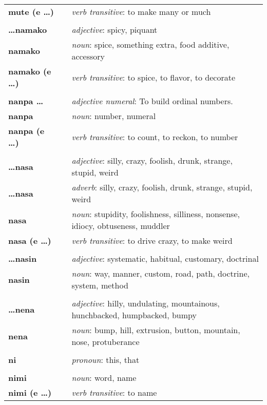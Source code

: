 \begin{supertabular}{p{2,5cm}|ll}
\textbf{mute (e \dots)} && \textit{verb transitive}: to make many or much \\ 
 && \\ %
\textbf{\dots namako} && \textit{adjective}: spicy, piquant \\ 
\textbf{namako} && \textit{noun}: spice, something extra, food additive, accessory \\ 
\textbf{namako (e \dots)} && \textit{verb transitive}: to spice, to flavor, to decorate \\ 
 && \\ %
\textbf{nanpa \dots} && \textit{adjective numeral}: To build ordinal numbers. \\ 
\textbf{nanpa} && \textit{noun}: number, numeral \\ 
\textbf{nanpa (e \dots)} && \textit{verb transitive}: to count, to reckon,  to number \\ 
 && \\ %
\textbf{\dots nasa} && \textit{adjective}: silly, crazy, foolish, drunk, strange, stupid, weird \\ 
\textbf{\dots nasa} && \textit{adverb}: silly, crazy, foolish, drunk, strange, stupid, weird \\ 
\textbf{nasa} && \textit{noun}: stupidity, foolishness, silliness, nonsense, idiocy, obtuseness, muddler \\ 
\textbf{nasa (e \dots)} && \textit{verb transitive}: to drive crazy, to make weird \\ 
 && \\ %
\textbf{\dots nasin} && \textit{adjective}: systematic, habitual, customary, doctrinal \\ 
\textbf{nasin} && \textit{noun}: way, manner, custom, road, path, doctrine, system, method \\ 
 && \\ %
\textbf{\dots nena} && \textit{adjective}: hilly, undulating, mountainous, hunchbacked, humpbacked, bumpy \\ 
\textbf{nena} && \textit{noun}: bump, hill, extrusion, button, mountain, nose, protuberance \\ 
 && \\ %
\textbf{ni} && \textit{pronoun}: this, that \\ 
 && \\ %
\textbf{nimi} && \textit{noun}: word, name \\ 
\textbf{nimi (e \dots )} && \textit{verb transitive}: to name \\ 

\end{supertabular}

